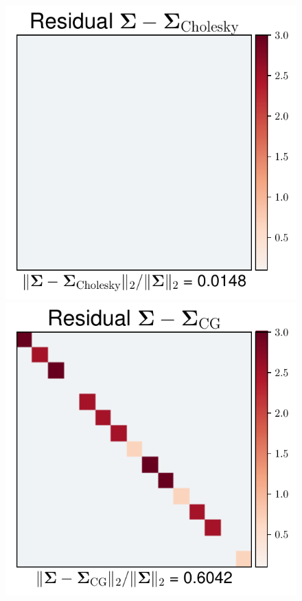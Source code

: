 \documentclass[aspectratio=169]{beamer}
\begin{document}
\begin{frame}
\begin{figure}
    \mbox{{\includegraphics[scale=0.3]{src/images/simu1_ex2_A_Chol.pdf}}}
    \mbox{{\includegraphics[scale=0.3]{src/images/simu1_ex2_A_CG.pdf}}}

\end{figure}
\end{frame}
\end{document}

